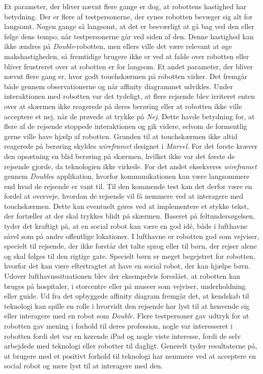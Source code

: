 Et parameter, der bliver nævnt flere gange er dog, at robottens hastighed har betydning. Der er flere af testpersonerne, der synes robotten bevæger sig alt for langsomt. Nogen gange så langsomt, at det er besværligt at gå bag ved den eller følge dens tempo, når testpersonerne går ved siden af den. Denne hastighed kan ikke ændres på \textit{Double}-robotten, men ellers ville det være relevant at øge makshastigheden, så fremtidige brugere ikke er ved at falde over robotten eller bliver frustreret over at robotten er for langsom.\blankline
%
Et andet parameter, der bliver nævnt flere gang er, hvor godt touchskærmen på robotten virker. Det fremgår både gennem observationerne og når affinity diagrammet udvikles. Under interaktionen med robotten var det tydeligt, at flere rejsende blev irriteret enten over at skærmen ikke reagerede på deres berøring eller at robotten ikke ville acceptere et nej, når de prøvede at trykke på \textit{Nej}. Dette havde betydning for, at flere af de rejsende stoppede interaktionen og gik videre, selvom de formentlig gerne ville have hjælp af robotten. Grunden til at touchskærmen ikke altid reagerede på berøring skyldes \textit{wireframet} designet i \textit{Marvel}. For det første kræver den opsætning en blid berøring på skærmen, hvilket ikke var det første de rejsende gjorde, da teknologien ikke virkede. For det andet eksekveres \textit{wireframet} gennem \textit{Double}s applikation, hvorfor kommunikationen kan være langsommere end hvad de rejsende er vant til. Til den kommende test kan det derfor være en fordel at overveje, hvordan de rejsende vil få nemmere ved at interagere med touchskærmen. Dette kan eventuelt gøres ved at implementere et stykke tekst, der fortæller at der skal trykkes blidt på skærmen.\blankline
%
Baseret på feltundersøgelsen, tyder det kraftigt på, at en social robot kan være en god idé, både i lufthavne såvel som på andre offentlige lokationer. I lufthavne er robotten god som vejviser, specielt til rejsende, der ikke forstår det talte sprog eller til børn, der rejser alene og skal følges til den rigtige gate. Specielt børn er meget begejstret for robotten, hvorfor det kan være eftertragtet at have en social robot, der kan hjælpe børn. Udover lufthavnssituationen blev der eksempelvis foreslået, at robotten kan bruges på hospitaler, i storcentre eller på museer som vejviser, underholdning eller guide. Ud fra det opbyggede affinity diagram fremgår det, at kendskab til teknologi kan spille en rolle i hvorvidt den rejsende har lyst til at henvende sig eller interagere med en robot som \textit{Double}. Flere testpersoner gav udtryk for at robotten gav mening i forhold til deres profession, nogle var interesseret i robotten fordi det var en kørende iPad og nogle viste interesse, fordi de selv arbejdede med teknologi eller robotter til dagligt. Generelt tyder resultaterne på, at brugere med et positivt forhold til teknologi har nemmere ved at acceptere en social robot og mere lyst til at interagere med den. 

